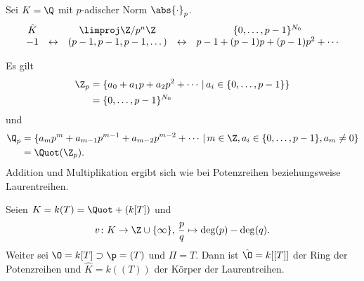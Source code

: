 \begin{Bsp}
Sei $K=\Q$ mit $p$-adischer Norm $\abs{\cdot}_p$.
\[\begin{array}{ccccc}
\hat{K} & & \limproj \Z /p^n \Z & & \{0, \dots, p-1  \}^{N_0} \\
-1 & \leftrightarrow & (p-1, p-1, p-1, \dots) & \leftrightarrow & p-1 + (p-1)p +(p-1)p^2 + \cdots
\end{array}
\]
\end{Bsp}

\begin{Kor}
Es gilt
\begin{align*}
\Z_p 
&= \{ a_0 + a_1p +a_2p^2 + \cdots \,|\, a_i \in \{0,\dots,p-1\}  \} \\
&=\{0, \dots, p-1  \}^{N_0}
\end{align*}
und
\begin{align*}
\Q_p 
&= \{ a_mp^m + a_{m-1}p^{m-1}+ a_{m-2}p^{m-2}  + \cdots \,|\, m \in \Z,  a_i \in \{0,\dots,p-1\}, a_m \neq 0  \} \\
&=\Quot(\Z_p).
\end{align*}
Addition und Multiplikation ergibt sich wie bei Potenzreihen beziehungsweise Laurentreihen.
\end{Kor}


\begin{Bsp}
Seien $K=k(T) = \Quot+(k[T])$ und
\[ v \colon K \to \Z\cup \{\infty \}, \, \frac{p}{q} \mapsto \deg(p) - \deg(q).
\]
Weiter sei $\O = k[T] \supset \p = (T)$ und $\Pi = T$. Dann ist
$\hat{\O} = k[[T]]$ der Ring der Potenzreihen und $\hat{K} = k((T))$ der Körper der Laurentreihen.
\end{Bsp}



